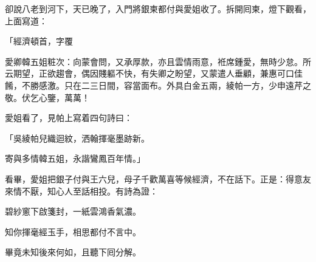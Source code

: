 卻說八老到河下，天已晚了，入門將銀柬都付與愛姐收了。拆開囘柬，燈下觀看，上面寫道：

\begin{myquote}[\markfont]
「經濟頓首，字覆

愛卿韓五姐粧次：向蒙會問，又承厚款，亦且雲情雨意，袵席鍾愛，無時少怠。所云期望，正欲趨會，偶因賤軀不快，有失卿之盼望，又蒙遣人垂顧，兼惠可口佳餚，不勝感激。只在二三日間，容當面布。外具白金五兩，綾帕一方，少申遠芹之敬。伏乞心鑒，萬萬！

\end{myquote}

愛姐看了，見帕上寫着四句詩曰：

\begin{myquote}
「吳綾帕兒織迴紋，洒翰揮毫墨跡新。

寄與多情韓五姐，永諧鸞鳳百年情。」
\end{myquote}

看畢，愛姐把銀子付與王六兒，母子千歡萬喜等候經濟，不在話下。正是：得意友來情不厭，知心人至話相投。有詩為證：

\begin{myquote}
碧紗窻下啟箋封，一紙雲鴻香氣濃。

知你揮毫經玉手，相思都付不言中。
\end{myquote}

畢竟未知後來何如，且聽下囘分解。

